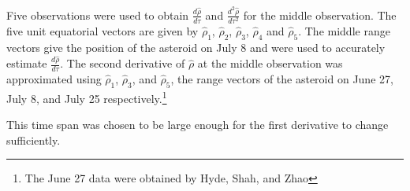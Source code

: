 \documentclass[12pt,journal,compsoc]{IEEEtran}
\begin{document}
Five observations were used to obtain $\frac{d\hat{\rho}}{d\tau}$ and $\frac{d^2\hat{\rho}}{d\tau^2}$ 
for the middle observation.
The five unit equatorial vectors are given by $\hat{\rho}_1$, $\hat{\rho}_2$, $\hat{\rho}_3$, $\hat{\rho}_4$ 
and $\hat{\rho}_5$. 
The middle range vectors give the position of the asteroid on July 8 
and were used to accurately estimate $\frac{d\hat{\rho}}{d\tau}$.
The second derivative of $\hat{\rho}$ at the middle observation was approximated 
using $\hat{\rho}_1$, $\hat{\rho}_3$, and $\hat{\rho}_5$, 
the range vectors of the asteroid on June 27, July 8, and July 25 respectively.\footnote{The June 27 data were obtained by Hyde, Shah, and Zhao} 

This time span was chosen to be large enough for the first derivative to change sufficiently.

\end{document}
